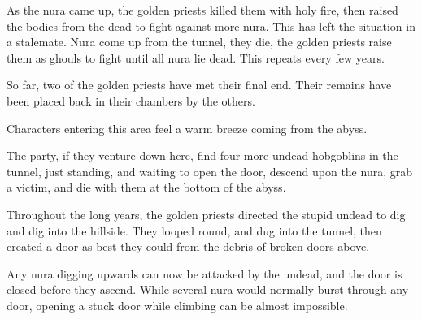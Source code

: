 \begin{multicols}{2}
\begin{boxtext}
As the nura came up, the golden priests killed them with holy fire, then raised the bodies from the dead to fight against more nura.  This has left the situation in a stalemate.  Nura come up from the tunnel, they die, the golden priests raise them as ghouls to fight until all nura lie dead.  This repeats every few years.

So far, two of the golden priests have met their final end.  Their remains have been placed back in their chambers by the others.

\end{boxtext}

Characters entering this area feel a warm breeze coming from the abyss.


The party, if they venture down here, find four more undead hobgoblins in the tunnel, just standing, and waiting to open the door, descend upon the nura, grab a victim, and die with them at the bottom of the abyss.

\begin{boxtext}
	Throughout the long years, the golden priests directed the stupid undead to dig and dig into the hillside.  They looped round, and dug into the tunnel, then created a door as best they could from the debris of broken doors above.

Any nura digging upwards can now be attacked by the undead, and the door is closed before they ascend.  While several nura would normally burst through any door, opening a stuck door while climbing can be almost impossible.
	
\end{boxtext}

\end{multicols}

